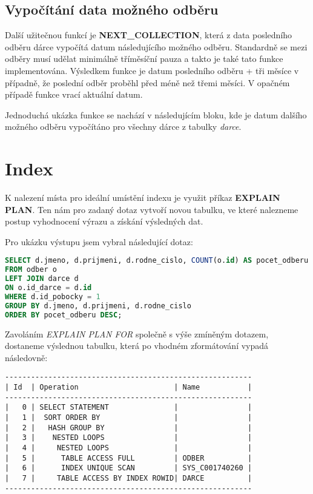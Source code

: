 \documentclass[10pt,a4paper]{article}
\begin{document}
\subsection{Vypočítání data možného odběru}
    Další užitečnou funkcí je \textbf{NEXT\_COLLECTION}, která z data
    posledního odběru dárce vypočítá datum následujícího možného odběru.
    Standardně se mezi odběry musí udělat minimálně tříměsíční pauza a takto
    je také tato funkce implementována. Výsledkem funkce je datum posledního
    odběru + tři měsíce v případně, že poslední odběr proběhl před méně než
    třemi měsíci. V opačném případě funkce vrací aktuální datum.

    Jednoduchá ukázka funkce se nachází v následujícím bloku, kde je datum
    dalšího možného odběru vypočítáno pro všechny dárce z tabulky
    \textit{darce}.
\section{Index}
    K nalezení místa pro ideální umístění indexu je využit příkaz
    \textbf{EXPLAIN PLAN}. Ten nám pro zadaný dotaz vytvoří novou tabulku,
    ve které nalezneme postup vyhodnocení výrazu a získání výsledných dat.

    Pro ukázku výstupu jsem vybral následující dotaz:
    \begin{lstlisting}[language=SQL,
                       caption=Dotaz pro demonstraci optimalizace]
SELECT d.jmeno, d.prijmeni, d.rodne_cislo, COUNT(o.id) AS pocet_odberu
FROM odber o
LEFT JOIN darce d
ON o.id_darce = d.id
WHERE d.id_pobocky = 1
GROUP BY d.jmeno, d.prijmeni, d.rodne_cislo
ORDER BY pocet_odberu DESC;
    \end{lstlisting}

    Zavoláním \textit{EXPLAIN PLAN FOR} společně s výše zmíněným dotazem,
    dostaneme výslednou tabulku, která po vhodném zformátování vypadá
    následovně:

    \begin{lstlisting}[caption=EXPLAIN PLAN bez zavedení indexu,
                       label={lst:ep1},xleftmargin=0.2\textwidth]
---------------------------------------------------------
| Id  | Operation                      | Name           |
---------------------------------------------------------
|   0 | SELECT STATEMENT               |                |
|   1 |  SORT ORDER BY                 |                |
|   2 |   HASH GROUP BY                |                |
|   3 |    NESTED LOOPS                |                |
|   4 |     NESTED LOOPS               |                |
|   5 |      TABLE ACCESS FULL         | ODBER          |
|   6 |      INDEX UNIQUE SCAN         | SYS_C001740260 |
|   7 |     TABLE ACCESS BY INDEX ROWID| DARCE          |
---------------------------------------------------------
    \end{lstlisting}
\end{document}
